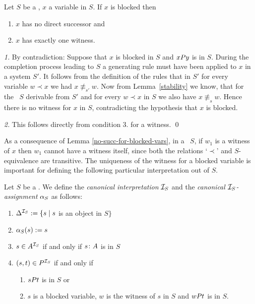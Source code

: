 \begin{lemma} \label{no-succ-for-blocked-vars}
  Let $S$ be a \cs, $x$ a variable in $S$. If $x$ is blocked then 
  \begin{enumerate}
   \item $x$ has no direct successor and 
   \item $x$ has exactly one witness.
  \end{enumerate}
\end{lemma}
\proof
{\it 1.} By contradiction: Suppose that $x$ is blocked in $S$ and $xPy$
is in $S$.
During the completion process leading to $S$ a generating rule must
have been applied to $x$ in a system $S'$.
It follows from the definition of the rules that in $S'$ for every
variable $w\prec x$ we had $x {\not\equiv}_{s'} w$.
Now from Lemma~\ref{stability} we know, that for the \cs\ $S$
derivable from $S'$  and for every $w\prec x$ in $S$
we also have $x {\not\equiv}_s w$.
Hence there is no witness for $x$ in $S$, contradicting the hypothesis
that $x$ is blocked.

\noindent
{\it 2.} This follows directly from condition 3. for a witness. \qed

As a consequence of Lemma \ref{no-succ-for-blocked-vars},
in a \cs\ $S$, if  $w_1$ is a witness of $x$ then $w_1$ cannot
have a witness itself, since both the relations `$\prec$' and
$S$-equivalence are transitive. The uniqueness of the witness for a blocked
variable is important for defining the following particular
interpretation out of $S$.

Let $S$ be a \cs. We define the {\em canonical interpretation} ${{\cal I}_S}$
and the {\em canonical ${{\cal I}_S}$-assignment} ${\alpha_S}$ as follows:

\begin{enumerate}
      \item $\Delta^{{\cal I}_S}  := \{s \mid s$ is an object in $S\}$
      \item $\alpha_S(s) := s$ 
      \item $s \in A^{{\cal I}_S}$ if and only if $s\colon A $ is in $S$
      \item $(s,t) \in P^{{\cal I}_S}$  if and only if
            \begin{enumerate}
              \item $sPt$ is in $S$ \quad or
              \item $s$ is a blocked variable, $w$ is the witness of $s$ in $S$ and
                    $wPt$ is in $S$.
            \end{enumerate}
\end{enumerate}\label{can-int}

